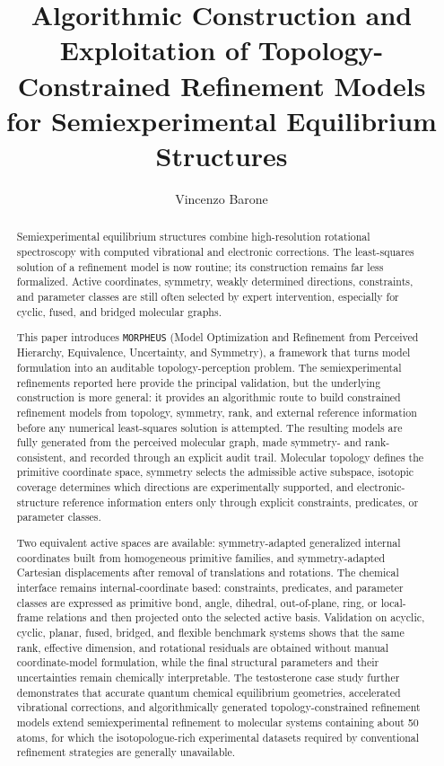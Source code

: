\documentclass[aip,jcp,reprint,longbibliography,floatfix]{revtex4-2}
\begin{document}
\title{Algorithmic Construction and Exploitation of Topology-Constrained Refinement Models for Semiexperimental Equilibrium Structures}

\author{Vincenzo Barone}

\begin{abstract}

Semiexperimental equilibrium structures combine high-resolution rotational spectroscopy with computed vibrational and electronic corrections. The least-squares solution of a refinement model is now routine; its construction remains far less formalized. Active coordinates, symmetry, weakly determined directions, constraints, and parameter classes are still often selected by expert intervention, especially for cyclic, fused, and bridged molecular graphs.

This paper introduces \texttt{MORPHEUS} (Model Optimization and Refinement from Perceived Hierarchy, Equivalence, Uncertainty, and Symmetry), a framework that turns model formulation into an auditable topology-perception problem. The semiexperimental refinements reported here provide the principal validation, but the underlying construction is more general: it provides an algorithmic route to build constrained refinement models from topology, symmetry, rank, and external reference information before any numerical least-squares solution is attempted. The resulting models are fully generated from the perceived molecular graph, made symmetry- and rank-consistent, and recorded through an explicit audit trail. Molecular topology defines the primitive coordinate space, symmetry selects the admissible active subspace, isotopic coverage determines which directions are experimentally supported, and electronic-structure reference information enters only through explicit constraints, predicates, or parameter classes.

Two equivalent active spaces are available: symmetry-adapted generalized internal coordinates built from homogeneous primitive families, and symmetry-adapted Cartesian displacements after removal of translations and rotations. The chemical interface remains internal-coordinate based: constraints, predicates, and parameter classes are expressed as primitive bond, angle, dihedral, out-of-plane, ring, or local-frame relations and then projected onto the selected active basis. Validation on acyclic, cyclic, planar, fused, bridged, and flexible benchmark systems shows that the same rank, effective dimension, and rotational residuals are obtained without manual coordinate-model formulation, while the final structural parameters and their uncertainties remain chemically interpretable. The testosterone case study further demonstrates that accurate quantum chemical equilibrium geometries, accelerated vibrational corrections, and algorithmically generated topology-constrained refinement models extend semiexperimental refinement to molecular systems containing about 50 atoms, for which the isotopologue-rich experimental datasets required by conventional refinement strategies are generally unavailable.


\end{abstract}
\end{document}
